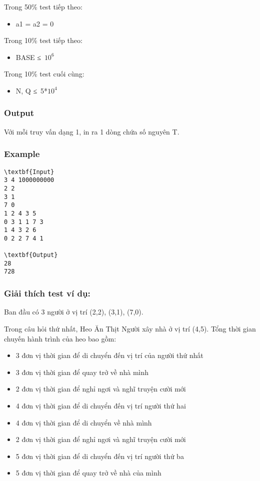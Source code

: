    Trong 50\% test tiếp theo:  
\begin{itemize}
	\item     a1 = a2 = 0   
\end{itemize}

   Trong 10\% test tiếp theo:  
\begin{itemize}
	\item     BASE ≤ $10^{6}$
\end{itemize}

   Trong 10\% test cuối cùng:  
\begin{itemize}
	\item     N, Q ≤ 5*$10^{4}$
\end{itemize}

\subsubsection{   Output  }

   Với mỗi truy vấn dạng 1, in ra 1 dòng chứa số nguyên T.  

\subsubsection{   Example  }


\begin{verbatim}
\textbf{Input}
3 4 1000000000
2 2
3 1
7 0
1 2 4 3 5
0 3 1 1 7 3
1 4 3 2 6
0 2 2 7 4 1

\textbf{Output}
28
728\end{verbatim}

\subsubsection{   Giải thích test ví dụ:  }

   Ban đầu có 3 người ở vị trí (2,2), (3,1), (7,0).  

   Trong câu hỏi thứ nhất, Heo Ăn Thịt Người xây nhà ở vị trí (4,5). Tổng thời gian chuyến hành trình của heo bao gồm:  
\begin{itemize}
	\item     3 đơn vị thời gian để di chuyển đến vị trí của người thứ nhất   
	\item     3 đơn vị thời gian để quay trở về nhà mình   
	\item     2 đơn vị thời gian để nghỉ ngơi và nghĩ truyện cười mới   
	\item     4 đơn vị thời gian để di chuyển đến vị trí người thứ hai   
	\item     4 đơn vị thời gian để di chuyển về nhà mình   
	\item     2 đơn vị thời gian để nghỉ ngơi và nghĩ truyện cười mới   
	\item     5 đơn vị thời gian để di chuyển đến vị trí người thứ ba   
	\item     5 đơn vị thời gian để quay trở về nhà của mình   
\end{itemize}

